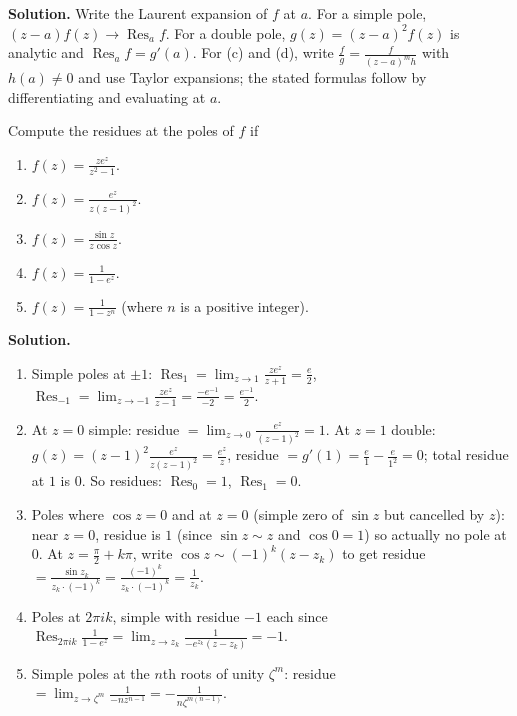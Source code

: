 \noindent\textbf{Solution.}
Write the Laurent expansion of $f$ at $a$. For a simple pole, $(z-a)f(z)\to\operatorname{Res}_a f$. For a double pole, $g(z)=(z-a)^2 f(z)$ is analytic and $\operatorname{Res}_a f=g'(a)$. For (c) and (d), write $\frac{f}{g}=\frac{f}{(z-a)^m h}$ with $h(a)\ne0$ and use Taylor expansions; the stated formulas follow by differentiating and evaluating at $a$.

\begin{problembox}
Compute the residues at the poles of \( f \) if
\begin{enumerate}[label=(\alph*)]
\item \( f(z) = \frac{ze^z}{z^2 - 1} \).
\item \( f(z) = \frac{e^z}{z(z - 1)^2} \).
\item \( f(z) = \frac{\sin z}{z \cos z} \).
\item \( f(z) = \frac{1}{1 - e^z} \).
\item \( f(z) = \frac{1}{1 - z^n} \) (where \( n \) is a positive integer).
\end{enumerate}
\end{problembox}

\noindent\textbf{Solution.}
\begin{enumerate}[label=(\alph*)]
\item Simple poles at $\pm1$: $\operatorname{Res}_{1}=\lim_{z\to1}\frac{ze^z}{z+1}=\tfrac{e}{2}$, $\operatorname{Res}_{-1}=\lim_{z\to-1}\frac{ze^z}{z-1}=\tfrac{-e^{-1}}{-2}=\tfrac{e^{-1}}{2}$.
\item At $z=0$ simple: residue $=\lim_{z\to0}\frac{e^z}{(z-1)^2}=1$. At $z=1$ double: $g(z)=(z-1)^2\frac{e^z}{z(z-1)^2}=\frac{e^z}{z}$, residue $=g'(1)=\frac{e}{1}-\frac{e}{1^2}=0$; total residue at $1$ is $0$. So residues: $\operatorname{Res}_0=1$, $\operatorname{Res}_1=0$.
\item Poles where $\cos z=0$ and at $z=0$ (simple zero of $\sin z$ but cancelled by $z$): near $z=0$, residue is $1$ (since $\sin z\sim z$ and $\cos 0=1$) so actually no pole at $0$. At $z=\frac{\pi}{2}+k\pi$, write $\cos z\sim (-1)^k(z-z_k)$ to get residue $=\frac{\sin z_k}{z_k\cdot(-1)^k}=\frac{(-1)^k}{z_k\cdot(-1)^k}=\frac{1}{z_k}$.
\item Poles at $2\pi i k$, simple with residue $-1$ each since $\operatorname{Res}_{2\pi i k}\frac{1}{1-e^z}=\lim_{z\to z_k}\frac{1}{-e^{z_k}(z-z_k)}=-1$.
\item Simple poles at the $n$th roots of unity $\zeta^m$: residue $=\lim_{z\to\zeta^m}\frac{1}{-n z^{n-1}}=-\frac{1}{n\zeta^{m(n-1)}}$.
\end{enumerate}

